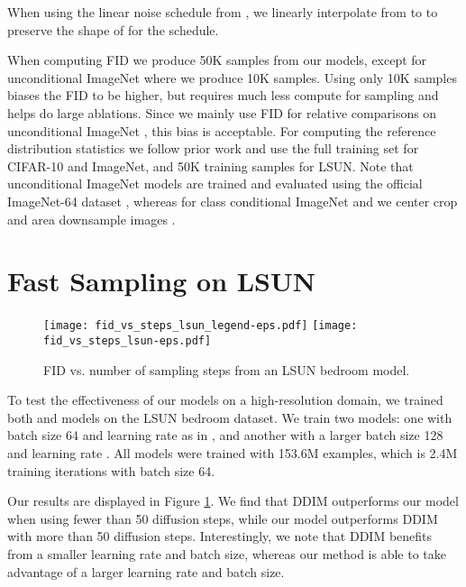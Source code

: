 \documentclass{article}
\begin{document}
When using the linear noise schedule from \citet{ddpm}, we linearly interpolate from  to  to preserve the shape of  for the  schedule.

When computing FID we produce 50K samples from our models, except for unconditional ImageNet  where we produce 10K samples. Using only 10K samples biases the FID to be higher, but requires much less compute for sampling and helps do large ablations. Since we mainly use FID for relative comparisons on unconditional ImageNet , this bias is acceptable. For computing the reference distribution statistics we follow prior work \citep{ddpm,biggan} and use the full training set for CIFAR-10 and ImageNet, and 50K training samples for LSUN. Note that unconditional ImageNet  models are trained and evaluated using the official ImageNet-64 dataset \cite{pixelrnn}, whereas for class conditional ImageNet  and  we center crop and area downsample images \cite{biggan}.



\section{Fast Sampling on LSUN }
\begin{figure}[ht]
    \centering
    \texttt{[image: fid\_vs\_steps\_lsun\_legend-eps.pdf]}
    \texttt{[image: fid\_vs\_steps\_lsun-eps.pdf]}
    \vskip -0.1in
    \caption{\label{fig:fidvssteps_lsun} FID vs. number of sampling steps from an LSUN  bedroom model.}
\end{figure}
To test the effectiveness of our  models on a high-resolution domain, we trained both  and  models on the LSUN bedroom \citep{lsun} dataset. We train two models: one with batch size 64 and learning rate  as in \citet{ddpm}, and another with a larger batch size 128 and learning rate . All models were trained with 153.6M examples, which is 2.4M training iterations with batch size 64.

Our results are displayed in Figure \ref{fig:fidvssteps_lsun}. We find that DDIM outperforms our  model when using fewer than 50 diffusion steps, while our  model outperforms DDIM with more than 50 diffusion steps. Interestingly, we note that DDIM benefits from a smaller learning rate and batch size, whereas our method is able to take advantage of a larger learning rate and batch size.
\end{document}
